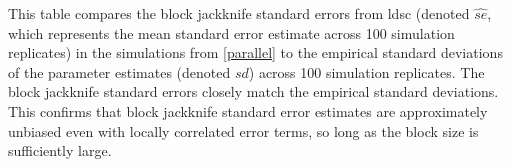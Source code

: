 This table compares the block jackknife standard errors from ldsc (denoted $\widehat{se}$, which represents the mean standard error estimate across 100 simulation replicates) in the simulations from \ref{parallel} to the empirical standard deviations of the parameter estimates (denoted $sd$) across 100 simulation replicates. The block jackknife standard errors closely match the empirical standard deviations. This confirms that block jackknife standard error estimates are approximately unbiased even with locally correlated error terms, so long as the block size is sufficiently large.